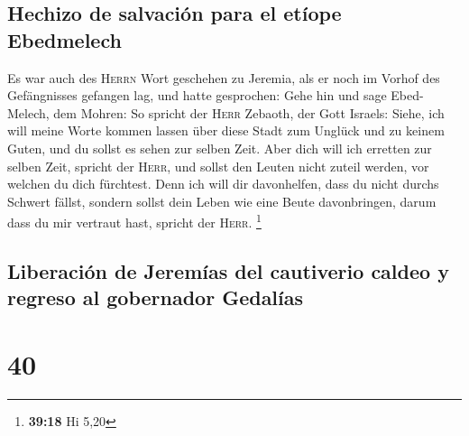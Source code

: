 \hypertarget{hechizo-de-salvaciuxf3n-para-el-etuxedope-ebedmelech}{%
\subsection{Hechizo de salvación para el etíope
Ebedmelech}\label{hechizo-de-salvaciuxf3n-para-el-etuxedope-ebedmelech}}

 Es war auch des \textsc{Herrn} Wort geschehen zu
Jeremia, als er noch im Vorhof des Gefängnisses gefangen lag, und hatte
gesprochen:  Gehe hin und sage Ebed-Melech, dem Mohren:
So spricht der \textsc{Herr} Zebaoth, der Gott Israels: Siehe, ich will
meine Worte kommen lassen über diese Stadt zum Unglück und zu keinem
Guten, und du sollst es sehen zur selben Zeit.  Aber dich
will ich erretten zur selben Zeit, spricht der \textsc{Herr}, und sollst
den Leuten nicht zuteil werden, vor welchen du dich fürchtest.
 Denn ich will dir davonhelfen, dass du nicht durchs
Schwert fällst, sondern sollst dein Leben wie eine Beute davonbringen,
darum dass du mir vertraut hast, spricht der \textsc{Herr}. \footnote{\textbf{39:18}
  Hi 5,20}

\hypertarget{liberaciuxf3n-de-jeremuxedas-del-cautiverio-caldeo-y-regreso-al-gobernador-gedaluxedas}{%
\subsection{Liberación de Jeremías del cautiverio caldeo y regreso al
gobernador
Gedalías}\label{liberaciuxf3n-de-jeremuxedas-del-cautiverio-caldeo-y-regreso-al-gobernador-gedaluxedas}}

\hypertarget{section-39}{%
\section{40}\label{section-39}}

